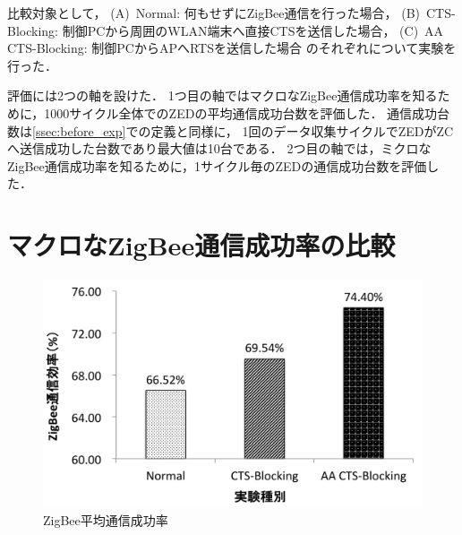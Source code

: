 \documentclass[12pt]{jreport}
\begin{document}
比較対象として，
(A)~Normal: 何もせずにZigBee通信を行った場合，
(B)~CTS-Blocking: 制御PCから周囲のWLAN端末へ直接CTSを送信した場合，
(C)~AA CTS-Blocking: 制御PCからAPへRTSを送信した場合
のそれぞれについて実験を行った．

評価には2つの軸を設けた．
1つ目の軸ではマクロなZigBee通信成功率を知るために，1000サイクル全体でのZEDの平均通信成功台数を評価した．
通信成功台数は\ref{ssec:before_exp}での定義と同様に，
1回のデータ収集サイクルでZEDがZCへ送信成功した台数であり最大値は10台である．
2つ目の軸では，ミクロなZigBee通信成功率を知るために，1サイクル毎のZEDの通信成功台数を評価した．

\section{マクロなZigBee通信成功率の比較}
\label{sec:exp_result_all}

\begin{figure}[bt]
 \centering
 \includegraphics[width=\columnwidth]{figure/eff_all_zigbee.pdf}
 \caption{ZigBee平均通信成功率}
 \label{fig:eff_all_zigbee}
\end{figure}
\end{document}
